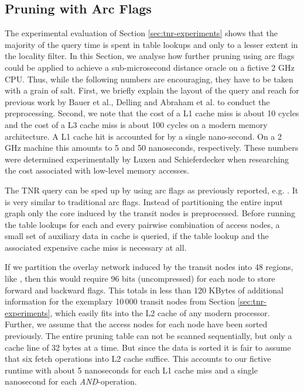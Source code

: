 \documentclass{llncs}
\newcommand{\etal}{et al.\xspace}
\begin{document}
\subsection{Pruning with Arc Flags}\label{sec:tnr-af}
The experimental evaluation of Section \ref{sec:tnr-experiments} shows that the majority of the query time is spent in table lookups and only to a lesser extent in the locality filter.
In this Section, we analyse how further pruning using arc flags could be applied to achieve a sub-microsecond distance oracle on a fictive 2 GHz CPU.
Thus, while the following numbers are encouraging, they have to be taken with a grain of salt.
First, we briefly explain the layout of the query and reach for previous work by Bauer \etal \cite{bdsssw-chgds-08}, Delling \cite{d-earpa-09} and Abraham \etal \cite{dgnw-phast-12} to conduct the preprocessing.
Second, we note that the cost of a L1 cache miss is about 10 cycles and the cost of a L3 cache miss is about 100 cycles on a modern memory architecture.
A L1 cache hit is accounted for by a single nano-second.
On a 2 GHz machine this amounts to 5 and 50 nanoseconds, respectively.
These numbers were determined experimentally by Luxen and Schieferdecker \cite{ls-dmlca-12} when researching the cost associated with low-level memory accesses.

The TNR query can be sped up by using arc flags as previously reported, e.g. \cite{bdsssw-chgds-08}.
It is very similar to traditional arc flags.
Instead of partitioning the entire input graph only the core induced by the transit nodes is preprocessed.
Before running the table lookups for each and every pairwise combination of access nodes, a small set of auxiliary data in cache is queried, if the table lookup and the associated expensive cache miss is necessary at all.

If we partition the overlay network induced by the transit nodes into 48 regions, like \cite{d-earpa-09}, then this would require 96 bits (uncompressed) for each node to store forward and backward flags.
This totals in less than 120 KBytes of additional information for the exemplary 10\,000 transit nodes from Section \ref{sec:tnr-experiments}, which easily fits into the L2 cache of any modern processor.
Further, we assume that the access nodes for each node have been sorted previously.
The entire pruning table can not be scanned sequentially, but only a cache line of 32 bytes at a time.
But since the data is sorted it is fair to assume that six fetch operations into L2 cache suffice.
This accounts to our fictive runtime with about 5 nanoseconds for each L1 cache miss and a single nanosecond for each \emph{AND}-operation.
\end{document}
